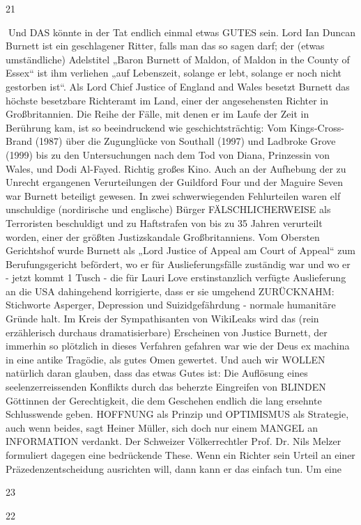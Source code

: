\begin{multicols}{2}
21

Und DAS könnte in der Tat endlich einmal etwas GUTES
sein.
Lord Ian Duncan Burnett ist ein geschlagener Ritter, falls
man das so sagen darf; der (etwas umständliche) Adelstitel „Baron Burnett of Maldon, of Maldon in the County of Essex“ ist ihm verliehen „auf Lebenszeit, solange
er lebt, solange er noch nicht gestorben ist“. Als Lord
Chief Justice of England and Wales besetzt Burnett das
höchste besetzbare Richteramt im Land, einer der angesehensten Richter in Großbritannien.
Die Reihe der Fälle, mit denen er im Laufe der Zeit in
Berührung kam, ist so beeindruckend wie geschichtsträchtig: Vom Kings-Cross-Brand (1987) über die Zugunglücke von Southall (1997) und Ladbroke Grove (1999)
bis zu den Untersuchungen nach dem Tod von Diana,
Prinzessin von Wales, und Dodi Al-Fayed. Richtig großes
Kino. Auch an der Aufhebung der zu Unrecht ergangenen Verurteilungen der Guildford Four und der Maguire
Seven war Burnett beteiligt gewesen. In zwei schwerwiegenden Fehlurteilen waren elf unschuldige (nordirische
und englische) Bürger FÄLSCHLICHERWEISE als Terroristen beschuldigt und zu Haftstrafen von bis zu 35 Jahren verurteilt worden, einer der größten Justizskandale
Großbritanniens.
Vom Obersten Gerichtshof wurde Burnett als „Lord Justice of Appeal am Court of Appeal“ zum Berufungsgericht
befördert, wo er für Auslieferungsfälle zuständig war
und wo er - jetzt kommt 1 Tusch - die für Lauri Love erstinstanzlich verfügte Auslieferung an die USA dahingehend korrigierte, dass er sie umgehend ZURÜCKNAHM:
Stichworte Asperger, Depression und Suizidgefährdung
- normale humanitäre Gründe halt.
Im Kreis der Sympathisanten von WikiLeaks wird das
(rein erzählerisch durchaus dramatisierbare) Erscheinen
von Justice Burnett, der immerhin so plötzlich in dieses
Verfahren gefahren war wie der Deus ex machina in eine
antike Tragödie, als gutes Omen gewertet. Und auch wir
WOLLEN natürlich daran glauben, dass das etwas Gutes
ist: Die Auflösung eines seelenzerreissenden Konflikts
durch das beherzte Eingreifen von BLINDEN Göttinnen
der Gerechtigkeit, die dem Geschehen endlich die lang
ersehnte Schlusswende geben. HOFFNUNG als Prinzip
und OPTIMISMUS als Strategie, auch wenn beides, sagt
Heiner Müller, sich doch nur einem MANGEL an INFORMATION verdankt.
Der Schweizer Völkerrechtler Prof. Dr. Nils Melzer formuliert dagegen eine bedrückende These. Wenn ein
Richter sein Urteil an einer Präzedenzentscheidung
ausrichten will, dann kann er das einfach tun. Um eine

23

22


\end{multicols}
